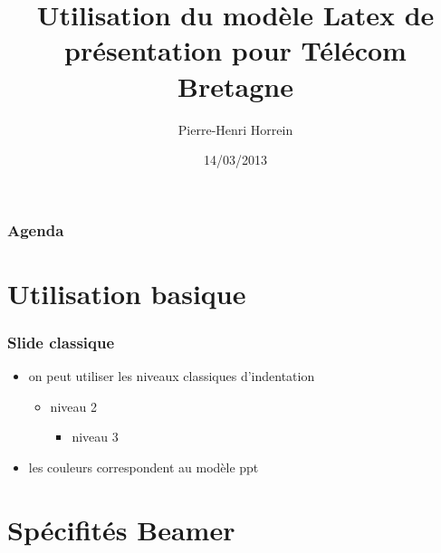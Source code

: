 \documentclass[t,9pt,pdftex]{beamer}
\title[Modèle Télécom Bretagne]{Utilisation du modèle Latex de présentation pour
Télécom Bretagne}
\author{Pierre-Henri Horrein}
\date{14/03/2013}
\begin{document}

\inserttitlepage



\begin{frame}[c]
	\frametitle{Agenda}
	\tableofcontents[hideallsubsections]
\end{frame}


\section{ Utilisation basique}



\begin{frame}[c]
	\frametitle{Slide classique}
	\begin{itemize}
		\item on peut utiliser les niveaux classiques d'indentation
			\begin{itemize}
				\item niveau 2
					\begin{itemize}
						\item niveau 3
					\end{itemize}
			\end{itemize}
		\item les couleurs correspondent au modèle ppt
	\end{itemize}
\end{frame}

\section{Spécifités Beamer}
\end{document}
